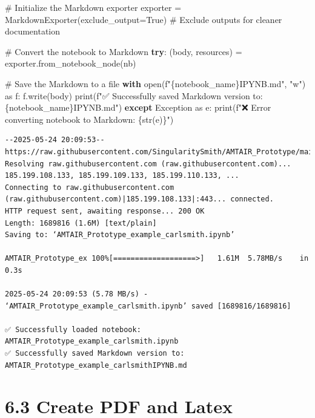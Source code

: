 \documentclass[
  11pt,
  letterpaper,
]{book}
\newenvironment{Shaded}{\begin{snugshade}}{\end{snugshade}}
\newcommand{\BuiltInTok}[1]{\textcolor[rgb]{0.00,0.23,0.31}{#1}}
\newcommand{\CommentTok}[1]{\textcolor[rgb]{0.37,0.37,0.37}{#1}}
\newcommand{\ControlFlowTok}[1]{\textcolor[rgb]{0.00,0.23,0.31}{\textbf{#1}}}
\newcommand{\ImportTok}[1]{\textcolor[rgb]{0.00,0.46,0.62}{#1}}
\newcommand{\NormalTok}[1]{\textcolor[rgb]{0.00,0.23,0.31}{#1}}
\newcommand{\OperatorTok}[1]{\textcolor[rgb]{0.37,0.37,0.37}{#1}}
\newcommand{\PreprocessorTok}[1]{\textcolor[rgb]{0.68,0.00,0.00}{#1}}
\newcommand{\SpecialCharTok}[1]{\textcolor[rgb]{0.37,0.37,0.37}{#1}}
\newcommand{\SpecialStringTok}[1]{\textcolor[rgb]{0.13,0.47,0.30}{#1}}
\newcommand{\StringTok}[1]{\textcolor[rgb]{0.13,0.47,0.30}{#1}}
\newcommand{\VariableTok}[1]{\textcolor[rgb]{0.07,0.07,0.07}{#1}}
\begin{document}
\begin{Shaded}
\begin{Highlighting}[]
\CommentTok{\# Initialize the Markdown exporter}
\NormalTok{exporter }\OperatorTok{=}\NormalTok{ MarkdownExporter(exclude\_output}\OperatorTok{=}\VariableTok{True}\NormalTok{)  }\CommentTok{\# Exclude outputs for cleaner documentation}

\CommentTok{\# Convert the notebook to Markdown}
\ControlFlowTok{try}\NormalTok{:}
\NormalTok{    (body, resources) }\OperatorTok{=}\NormalTok{ exporter.from\_notebook\_node(nb)}

    \CommentTok{\# Save the Markdown to a file}
    \ControlFlowTok{with} \BuiltInTok{open}\NormalTok{(}\SpecialStringTok{f"}\SpecialCharTok{\{}\NormalTok{notebook\_name}\SpecialCharTok{\}}\SpecialStringTok{IPYNB.md"}\NormalTok{, }\StringTok{"w"}\NormalTok{) }\ImportTok{as}\NormalTok{ f:}
\NormalTok{        f.write(body)}
    \BuiltInTok{print}\NormalTok{(}\SpecialStringTok{f"✅ Successfully saved Markdown version to: }\SpecialCharTok{\{}\NormalTok{notebook\_name}\SpecialCharTok{\}}\SpecialStringTok{IPYNB.md"}\NormalTok{)}
\ControlFlowTok{except} \PreprocessorTok{Exception} \ImportTok{as}\NormalTok{ e:}
    \BuiltInTok{print}\NormalTok{(}\SpecialStringTok{f"❌ Error converting notebook to Markdown: }\SpecialCharTok{\{}\BuiltInTok{str}\NormalTok{(e)}\SpecialCharTok{\}}\SpecialStringTok{"}\NormalTok{)}
\end{Highlighting}
\end{Shaded}

\begin{verbatim}
--2025-05-24 20:09:53--  https://raw.githubusercontent.com/SingularitySmith/AMTAIR_Prototype/main/data/example_carlsmith/AMTAIR_Prototype_example_carlsmith.ipynb
Resolving raw.githubusercontent.com (raw.githubusercontent.com)... 185.199.108.133, 185.199.109.133, 185.199.110.133, ...
Connecting to raw.githubusercontent.com (raw.githubusercontent.com)|185.199.108.133|:443... connected.
HTTP request sent, awaiting response... 200 OK
Length: 1689816 (1.6M) [text/plain]
Saving to: ‘AMTAIR_Prototype_example_carlsmith.ipynb’

AMTAIR_Prototype_ex 100%[===================>]   1.61M  5.78MB/s    in 0.3s    

2025-05-24 20:09:53 (5.78 MB/s) - ‘AMTAIR_Prototype_example_carlsmith.ipynb’ saved [1689816/1689816]

✅ Successfully loaded notebook: AMTAIR_Prototype_example_carlsmith.ipynb
✅ Successfully saved Markdown version to: AMTAIR_Prototype_example_carlsmithIPYNB.md
\end{verbatim}

\section{6.3 Create PDF and Latex}\label{create-pdf-and-latex}
\end{document}
